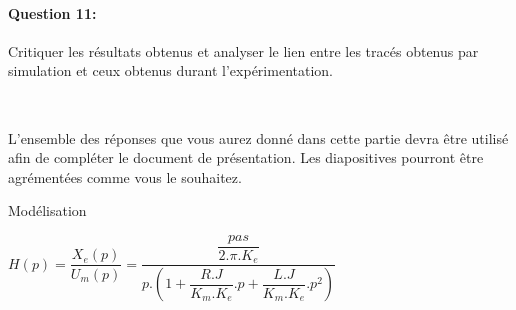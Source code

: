 \paragraph{Question 11:} Critiquer les résultats obtenus et analyser le lien entre les tracés obtenus par simulation et ceux obtenus durant l'expérimentation.

~\

L'ensemble des réponses que vous aurez donné dans cette partie devra être utilisé afin de compléter le document de présentation. Les diapositives pourront être agrémentées comme vous le souhaitez.

\ifdef{\public}{}{}

\newpage

\pagestyle{correction}\setcounter{section}{0}

Modélisation
\begin{center}
$H(p)=\dfrac{X_e(p)}{U_m(p)}=\dfrac{\dfrac{pas}{2.\pi.K_e}}{p.\left(1+\dfrac{R.J}{K_m.K_e}.p+\dfrac{L.J}{K_m.K_e}.p^2\right)}$
\end{center}

